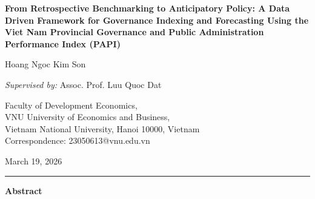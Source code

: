 \documentclass[12pt,a4paper]{article}
\begin{document}
\begin{titlepage}
  \centering
  \vspace*{-2cm}

  {\LARGE\bfseries
    From Retrospective Benchmarking to Anticipatory Policy: A Data Driven Framework for Governance Indexing and Forecasting Using the Viet Nam Provincial Governance and Public Administration Performance Index (PAPI)
  \par}

  \vspace{1cm}

  {\large Hoang Ngoc Kim Son}

  \vspace{0.5cm}

  {\large \textit{Supervised by:} Assoc. Prof. Luu Quoc Dat}
  
  \vspace{0.5cm}

  {\normalsize
    Faculty of Development Economics,\\
    VNU University of Economics and Business,\\
    Vietnam National University, Hanoi 10000, Vietnam\\[4pt]
    Correspondence:  23050613@vnu.edu.vn
  }
  
  \vspace{1.0cm}
  
  {\small March 19, 2026}

  \vspace{0.5cm}

  \hrule

  \vspace{1cm}

  {\large\textbf{Abstract}}


\end{titlepage}
\end{document}
